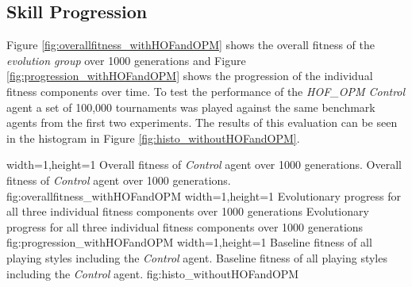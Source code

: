 \subsection{Skill Progression}
Figure \ref{fig:overallfitness_withHOFandOPM} shows the overall fitness of the \textit{evolution group} over 1000 generations and Figure \ref{fig:progression_withHOFandOPM} shows the progression of the individual fitness components over time. To test the performance of the \textit{HOF\_OPM Control} agent a set of 100,000 tournaments was played against the same benchmark agents from the first two experiments. The results of this evaluation can be seen in the histogram in Figure \ref{fig:histo_withoutHOFandOPM}. \par
{}%
  {width=1\textwidth,height=1\textheight}%
  {Overall fitness of \textit{Control} agent over 1000 generations.}%
  {Overall fitness of \textit{Control} agent over 1000 generations.}%
  {fig:overallfitness_withHOFandOPM}%
  {width=1\textwidth,height=1\textheight}%
  {Evolutionary progress for all three individual fitness components over 1000 generations}%
  {Evolutionary progress for all three individual fitness components over 1000 generations}%
  {fig:progression_withHOFandOPM}%
  {width=1\textwidth,height=1\textheight}%
  {Baseline fitness of all playing styles including the \textit{Control} agent.}%
  {Baseline fitness of all playing styles including the \textit{Control} agent.}%
  {fig:histo_withoutHOFandOPM}%
